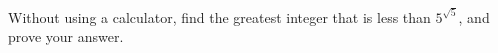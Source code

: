 Without using a calculator, find the greatest integer that is less than $5^{\sqrt5}$, and prove your answer.
